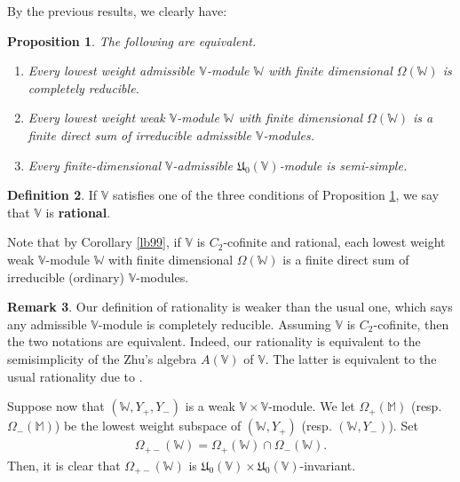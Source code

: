 \documentclass[12pt,b5paper,notitlepage]{report}
\theoremstyle{definition}
\newtheorem{df}{Definition}[section]
\newtheorem{rem}[df]{Remark}
\theoremstyle{plain}
\newtheorem{pp}[df]{Proposition}
\newcommand{\fk}{\mathfrak}
\newcommand{\Vbb}{\mathbb V}
\newcommand{\Wbb}{\mathbb W}
\newcommand{\Mbb}{\mathbb M}
\numberwithin{equation}{section}
\begin{document}
By the previous results, we clearly have:

\begin{pp}\label{lb132}
The following are equivalent.
\begin{enumerate}[label=(\alph*)]
\item Every lowest weight admissible $\Vbb$-module $\Wbb$  with finite dimensional $\Omega(\Wbb)$ is completely reducible.
\item Every lowest weight weak  $\Vbb$-module $\Wbb$  with finite dimensional $\Omega(\Wbb)$ is  a finite direct sum of irreducible admissible $\Vbb$-modules.
\item Every finite-dimensional $\Vbb$-admissible $\fk U_0(\Vbb)$-module is semi-simple.
\end{enumerate}
\end{pp}


\begin{df}\label{lb133}
If $\Vbb$ satisfies one of the three conditions of Proposition \ref{lb132}, we say that $\Vbb$ is \textbf{rational}.
\end{df}




Note that by Corollary \ref{lb99}, if $\Vbb$ is $C_2$-cofinite and rational, each lowest weight weak  $\Vbb$-module $\Wbb$  with finite dimensional $\Omega(\Wbb)$ is a finite direct sum of irreducible (ordinary) $\Vbb$-modules.



\begin{rem}
Our definition of rationality is weaker than the usual one, which says any admissible $\Vbb$-module is completely reducible. Assuming $\Vbb$ is $C_2$-cofinite, then the two notations are equivalent. Indeed, our rationality is equivalent to the semisimplicity of the Zhu's algebra $A(\Vbb)$ of $\Vbb$. The latter is equivalent to the usual rationality due to \cite{McR21}.
\end{rem}






Suppose now that $(\Wbb,Y_+,Y_-)$ is a weak $\Vbb\times\Vbb$-module. We let $\Omega_+(\Mbb)$ (resp. $\Omega_-(\Mbb)$) be the lowest weight subspace of $(\Wbb,Y_+)$ (resp. $(\Wbb,Y_-)$). Set \index{zz@$\Omega(\Wbb),\Omega_{+-}(\Wbb)$}
\begin{align}
\Omega_{+-}(\Wbb)=\Omega_+(\Wbb)\cap \Omega_-(\Wbb).\label{eq207}
\end{align}
Then, it is clear that $\Omega_{+-}(\Wbb)$ is $\fk U_0(\Vbb)\times \fk U_0(\Vbb)$-invariant.
\end{document}
